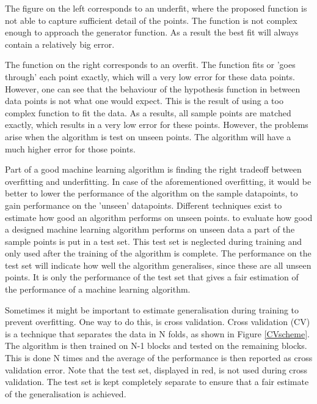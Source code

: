 
\npar

The figure on the left corresponds to an underfit, where the proposed function is not able to capture sufficient detail of the points. The function is not complex enough to approach the generator function. As a result the best fit will always contain a relatively big error.

\npar

The function on the right corresponds to an overfit. The function fits or 'goes through' each point exactly, which will a very low error for these data points. However, one can see that the behaviour of the hypothesis function in between data points is not what one would expect. This is the result of using a too complex function to fit the data. As a results, all sample points are matched exactly, which results in a very low error for these points. However, the problems arise when the algorithm is test on unseen points. The algorithm will have a much higher error for those points. 

\npar 

Part of a good machine learning algorithm is finding the right tradeoff between overfitting and underfitting. In case of the aforementioned overfitting, it would be better to lower the performance of the algorithm on the sample datapoints, to gain performance on the 'unseen' datapoints. Different techniques exist to estimate how good an algorithm performs on unseen points. to evaluate how good a designed machine learning algorithm performs on unseen data a part of the sample points is put in a test set. This test set is neglected during training and only used after the training of the algorithm is complete. The performance on the test set will indicate how well the algorithm generalises, since these are all unseen points. It is only the performance of the test set that gives a fair estimation of the performance of a machine learning algorithm. 

\npar

Sometimes it might be important to estimate generalisation during training to prevent overfitting. One way to do this, is cross validation. Cross validation (CV) is a technique that separates the data in N folds, as shown in Figure \ref{CVscheme}. The algorithm is then trained on N-1 blocks and tested on the remaining blocks. This is done N times and the average of the performance is then reported as cross validation error. Note that the test set, displayed in red, is not used during cross validation. The test set is kept completely separate to ensure that a fair estimate of the generalisation is achieved.

